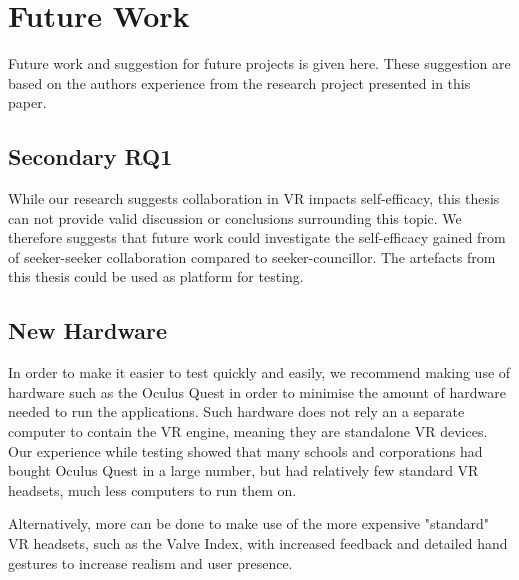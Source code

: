 

    
        


    

\section{Future Work}
Future work and suggestion for future projects is given here. These suggestion are based on the authors experience from the research project presented in this paper. 

\label{section:futureWork}

\subsection{Secondary RQ1}
While our research suggests collaboration in VR impacts self-efficacy, this thesis can not provide valid discussion or conclusions surrounding this topic. We therefore suggests that future work could investigate the self-efficacy gained from of seeker-seeker collaboration compared to seeker-councillor. The artefacts from this thesis could be used as platform for testing.  

\subsection{New Hardware}
In order to make it easier to test quickly and easily, we recommend making use of hardware such as the Oculus Quest \cite{hillmann2019comparing} in order to minimise the amount of hardware needed to run the applications. Such hardware does not rely an a separate computer to contain the VR engine, meaning they are standalone VR devices. Our experience while testing showed that many schools and corporations had bought Oculus Quest in a large number, but had relatively few standard VR headsets, much less computers to run them on. 

Alternatively, more can be done to make use of the more expensive "standard" VR headsets, such as the Valve Index, with increased feedback and detailed hand gestures to increase realism and user presence.

